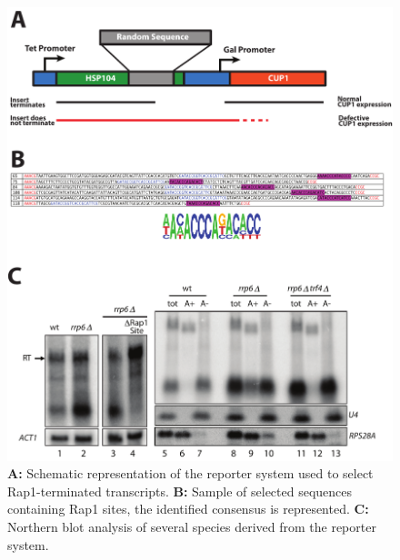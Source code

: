 \begin{figure}[hp!]

\centering
\includegraphics[width=\textwidth]{figures/results/rap/one.pdf}
\caption[Rap1-dependent transcripts are isolated from \invivo{} selection]{\textbf{A: }Schematic representation of the reporter system used to select Rap1-terminated transcripts. \textbf{B: }Sample of selected sequences containing Rap1 sites, the identified consensus is represented. \textbf{C: }Northern blot analysis of several species derived from the reporter system.}
\label{fig:one}

\end{figure}


